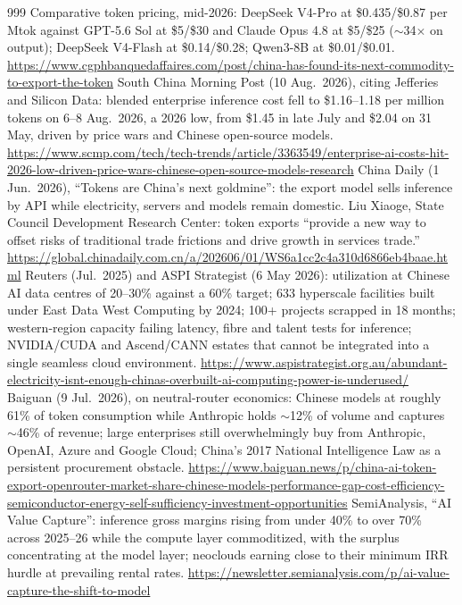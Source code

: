 \begin{thebibliography}{999}
 Comparative token pricing, mid-2026: DeepSeek V4-Pro at \$0.435/\$0.87 per Mtok against GPT-5.6 Sol at \$5/\$30 and Claude Opus 4.8 at \$5/\$25 ($\sim$34$\times$ on output); DeepSeek V4-Flash at \$0.14/\$0.28; Qwen3-8B at \$0.01/\$0.01. \url{https://www.cgphbanquedaffaires.com/post/china-has-found-its-next-commodity-to-export-the-token}
 South China Morning Post (10 Aug.\ 2026), citing Jefferies and Silicon Data: blended enterprise inference cost fell to \$1.16--1.18 per million tokens on 6--8 Aug.\ 2026, a 2026 low, from \$1.45 in late July and \$2.04 on 31 May, driven by price wars and Chinese open-source models. \url{https://www.scmp.com/tech/tech-trends/article/3363549/enterprise-ai-costs-hit-2026-low-driven-price-wars-chinese-open-source-models-research}
 China Daily (1 Jun.\ 2026), ``Tokens are China's next goldmine'': the export model sells inference by API while electricity, servers and models remain domestic. Liu Xiaoge, State Council Development Research Center: token exports ``provide a new way to offset risks of traditional trade frictions and drive growth in services trade.'' \url{https://global.chinadaily.com.cn/a/202606/01/WS6a1cc2c4a310d6866eb4baae.html}
 Reuters (Jul.\ 2025) and ASPI Strategist (6 May 2026): utilization at Chinese AI data centres of 20--30\% against a 60\% target; 633 hyperscale facilities built under East Data West Computing by 2024; 100+ projects scrapped in 18 months; western-region capacity failing latency, fibre and talent tests for inference; NVIDIA/CUDA and Ascend/CANN estates that cannot be integrated into a single seamless cloud environment. \url{https://www.aspistrategist.org.au/abundant-electricity-isnt-enough-chinas-overbuilt-ai-computing-power-is-underused/}
 Baiguan (9 Jul.\ 2026), on neutral-router economics: Chinese models at roughly 61\% of token consumption while Anthropic holds $\sim$12\% of volume and captures $\sim$46\% of revenue; large enterprises still overwhelmingly buy from Anthropic, OpenAI, Azure and Google Cloud; China's 2017 National Intelligence Law as a persistent procurement obstacle. \url{https://www.baiguan.news/p/china-ai-token-export-openrouter-market-share-chinese-models-performance-gap-cost-efficiency-semiconductor-energy-self-sufficiency-investment-opportunities}
 SemiAnalysis, ``AI Value Capture'': inference gross margins rising from under 40\% to over 70\% across 2025--26 while the compute layer commoditized, with the surplus concentrating at the model layer; neoclouds earning close to their minimum IRR hurdle at prevailing rental rates. \url{https://newsletter.semianalysis.com/p/ai-value-capture-the-shift-to-model}



\end{thebibliography}
